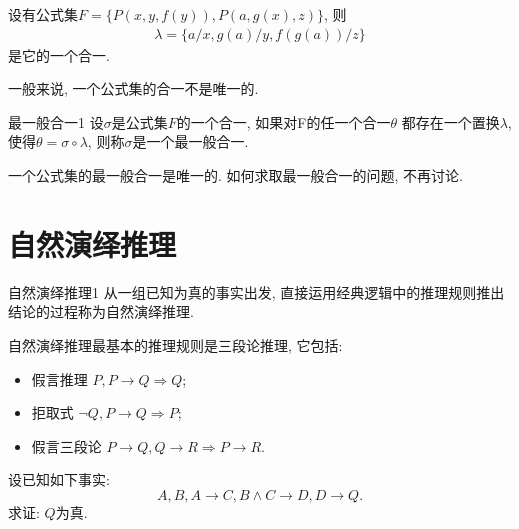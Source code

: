\begin{example}
设有公式集$F=\{P(x,y,f(y)), P(a,g(x),z)\}$, 则
\begin{align}
  \lambda =\{a/x, g(a)/y, f(g(a))/z\}
\end{align}
是它的一个合一.
\end{example}

\begin{remark}
  一般来说, 一个公式集的合一不是唯一的.
\end{remark}

\begin{mydef}{最一般合一}{1}
设$\sigma$是公式集$F$的一个合一, 如果对F的任一个合一$\theta$ 都存在一个置换$\lambda$, 使得$\theta =\sigma \circ \lambda$, 则称$\sigma$是一个最一般合一.
\end{mydef}

\begin{remark}
  一个公式集的最一般合一是唯一的. 如何求取最一般合一的问题, 不再讨论.
\end{remark}

\section{自然演绎推理}
\begin{mydef}{自然演绎推理}{1}
从一组已知为真的事实出发, 直接运用经典逻辑中的推理规则推出结论的过程称为自然演绎推理.
\end{mydef}

自然演绎推理最基本的推理规则是三段论推理, 它包括:
\begin{itemize}
\item 假言推理         $P,  P\rightarrow Q \Rightarrow  Q$;
\item 拒取式            $\neg  Q,  P\rightarrow Q \Rightarrow  P$;
\item 假言三段论     $P\rightarrow Q,  Q\rightarrow R \Rightarrow  P\rightarrow R$.
\end{itemize}

\begin{example}
设已知如下事实:
          $$A,  B,  A\rightarrow C,  B\wedge C\rightarrow D,  D\rightarrow Q.$$
求证: $Q$为真.
\end{example}

